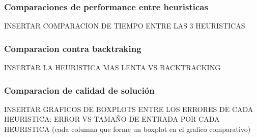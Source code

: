 \subsubsection{Comparaciones de performance entre heuristicas}
INSERTAR COMPARACION DE TIEMPO ENTRE LAS 3 HEURISTICAS
\subsubsection*{Comparacion contra backtraking}
INSERTAR LA HEURISTICA MAS LENTA VS BACKTRACKING
\subsubsection{Comparacion de calidad de solución}
INSERTAR GRAFICOS DE BOXPLOTS ENTRE LOS ERRORES DE CADA HEURISTICA:
	ERROR VS TAMAÑO DE ENTRADA POR CADA HEURISTICA (cada columna que forme un boxplot en el grafico comparativo)
	